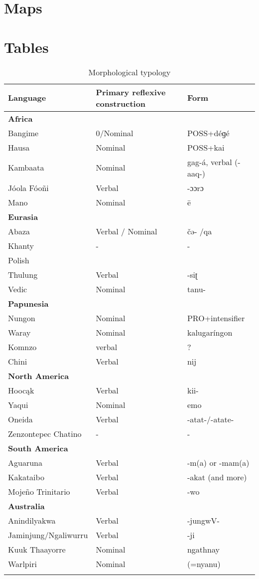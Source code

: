 \documentclass[output=paper]{langsci/langscibook}
\begin{document}
\section{Maps}
\section{Tables} 

\begin{table}
\begin{tabularx}{\textwidth}{XXX}
\lsptoprule
Language & Primary reflexive construction & Form \\
\midrule
\textbf{Africa} & & \\
Bangime & 0/Nominal & POSS+déɡé \\
Hausa & Nominal & POSS+kai \\
Kambaata & Nominal & gag-á, verbal (-aaq-) \\
Jóola Fóoñi & Verbal & -ɔɔrɔ \\
Mano & Nominal & ē \\
\tablevspace
\textbf{Eurasia}\\
Abaza & Verbal / Nominal & čə- /qa \\
Khanty & - & - \\
Polish & & \\
Thulung & Verbal & -siʈ \\
Vedic & Nominal & tanu- \\
\tablevspace
\textbf{Papunesia}\\
Nungon & Nominal & PRO+intensifier \\
Waray & Nominal & kalugaríngon  \\
Komnzo & verbal & ? \\
Chini & Verbal & nij \\
\tablevspace
\textbf{North America} \\
Hoocąk & Verbal& kii-    \\
Yaqui & Nominal & emo \\
Oneida & Verbal & -atat-/-atate- \\
Zenzontepec Chatino & - & - \\
\tablevspace
\textbf{South America} \\
Aguaruna & Verbal & -m(a) or -mam(a)\\
Kakataibo & Verbal & -akat (and more) \\
Mojeño Trinitario & Verbal & -wo \\
\tablevspace
\textbf{Australia} \\
Anindilyakwa & Verbal & -jungwV- \\
Jaminjung/Ngaliwurru & Verbal & -ji \\
Kuuk Thaayorre & Nominal & ngathnay \\
Warlpiri & Nominal & (=nyanu) \\
\lspbottomrule
\end{tabularx}
\caption{Morphological typology}
\label{tab:chapterhandle:keytotable}
\end{table}
\end{document}
